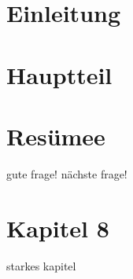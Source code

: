 \documentclass[11pt,a4paper]{article}
\begin{document}
\section{Einleitung}

\section{Hauptteil}

\section{Resümee}

gute frage!
nächste frage!


\section{Kapitel 8}
starkes kapitel
\end{document}
